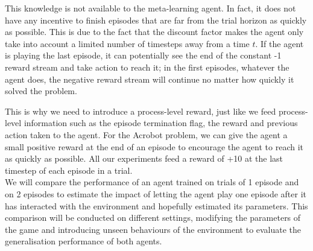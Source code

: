 \documentclass[letterpaper]{article}
\begin{document}
This knowledge is not available to the meta-learning agent. In fact, it does
not have any incentive to finish episodes that are far from the trial horizon
as quickly as possible. This is due to the fact that the discount factor makes
the agent only take into account a limited number of timesteps away from a time
$t$. If the agent is playing the last episode, it can potentially see the
end of the constant -1 reward stream and take action to reach it; in the first
episodes, whatever the agent does, the negative reward stream will continue no 
matter how quickly it solved the problem. 


This is why we need to introduce a process-level reward, just like we feed
process-level information such as the episode termination flag, the reward
and previous action taken to the agent. For the Acrobot problem, we can
give the agent a small positive reward at the end of an episode to encourage
the agent to reach it as quickly as possible. All our experiments feed a
reward of +10 at the last timestep of each episode in a trial.\\

We will compare the performance of an agent trained on trials of 1 episode
and on 2 episodes to estimate the impact of letting the agent play one episode
after it has interacted with the environment and hopefully estimated
its parameters. This comparison will be conducted on different settings,
modifying the parameters of the game and introducing unseen behaviours of
the environment to evaluate the generalisation performance of both agents.
\end{document}
